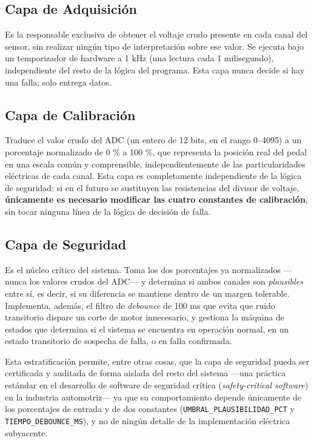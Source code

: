 \documentclass[12pt, letterpaper]{article}
\begin{document}
	\subsection{Capa de Adquisición}
	Es la responsable exclusiva de obtener el voltaje crudo presente en cada canal del sensor, sin realizar ningún tipo de interpretación sobre ese valor. Se ejecuta bajo un temporizador de hardware a 1 kHz (una lectura cada 1 milisegundo), independiente del resto de la lógica del programa. Esta capa nunca decide si hay una falla; solo entrega datos.
	
	\subsection{Capa de Calibración}
	Traduce el valor crudo del ADC (un entero de 12 bits, en el rango 0--4095) a un porcentaje normalizado de 0 \% a 100 \%, que representa la posición real del pedal en una escala común y comprensible, independientemente de las particularidades eléctricas de cada canal. Esta capa es completamente independiente de la lógica de seguridad: si en el futuro se sustituyen las resistencias del divisor de voltaje, \textbf{únicamente es necesario modificar las cuatro constantes de calibración}, sin tocar ninguna línea de la lógica de decisión de falla.
	
	\subsection{Capa de Seguridad}
	Es el núcleo crítico del sistema. Toma los dos porcentajes ya normalizados —nunca los valores crudos del ADC— y determina si ambos canales son \textit{plausibles} entre sí, es decir, si su diferencia se mantiene dentro de un margen tolerable. Implementa, además, el filtro de \textit{debounce} de 100 ms que evita que ruido transitorio dispare un corte de motor innecesario, y gestiona la máquina de estados que determina si el sistema se encuentra en operación normal, en un estado transitorio de sospecha de falla, o en falla confirmada.
	
	Esta estratificación permite, entre otras cosas, que la capa de seguridad pueda ser certificada y auditada de forma aislada del resto del sistema —una práctica estándar en el desarrollo de software de seguridad crítica (\textit{safety-critical software}) en la industria automotriz— ya que su comportamiento depende únicamente de los porcentajes de entrada y de dos constantes (\texttt{UMBRAL\_PLAUSIBILIDAD\_PCT} y \texttt{TIEMPO\_DEBOUNCE\_MS}), y no de ningún detalle de la implementación eléctrica subyacente.
	
\end{document}
